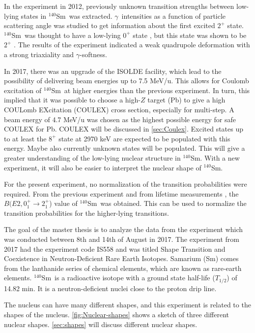 \documentclass[twoside,english]{uiofysmaster/uiofysmaster}
\newcommand{\Sm}{$^{140}$Sm} %
\newcommand{\ga}{$\gamma$}
\let\orgautoref\autoref
\renewcommand{\autoref}
        {%
		 \def\sectionautorefname{Section}%
		 \def\subsectionautorefname{Section}%
		 \def\subsubsectionautorefname{Section}%
		 \def\chapterautorefname{Chapter}%
          \orgautoref}
\begin{document}
In the experiment in 2012, previously unknown transition strengths between low-lying states in \Sm\ was extracted. 
\ga\ intensities as a function of particle scattering angle was studied to get information about the first excited $2^+$ state.
\Sm\ was thought to have a low-lying $0^+$ state \cite{Firestone}, but this state was shown to be $2^+$ \cite{Samorajczyk2015}. 
The results of the experiment indicated a weak quadrupole deformation with a strong triaxiality and \ga-softness.

In 2017, there was an upgrade of the ISOLDE facility, which lead to the possibility of delivering beam energies up to 7.5 MeV/u. 
This allows for Coulomb excitation of \Sm\ at higher energies than the previous experiment.
In turn, this implied that it was possible to choose a high-$Z$ target (Pb) to give a high COULomb EXcitation (COULEX) cross section, especially for multi-step.
A beam energy of 4.7 MeV/u was chosen as the highest possible energy for safe COULEX for Pb.
COULEX will be discussed in \autoref{sec:Coulex}.
Excited states up to at least the $8^+$ state at 2970 keV are expected to be populated with this energy.
Maybe also currently unknown states will be populated.
This will give a greater understanding of the low-lying nuclear structure in \Sm.
With a new experiment, it will also be easier to interpret the nuclear shape of \Sm.

For the present experiment, no normalization of the transition probabilities were required.
From the previous experiment \cite{Klintefjord2016} and from lifetime measurements \cite{BelloGarrote2015}, the $B(E2, 0_1^+ \rightarrow 2_1^+$) value of \Sm\ was obtained. 
This can be used to normalize the transition probabilities for the higher-lying transitions.

The goal of the master thesis is to analyze the data from the experiment which was conducted between 8th and 14th of August in 2017.  
The experiment from 2017 had the experiment code IS558 and was titled Shape Transition and Coexistence in Neutron-Deficient Rare Earth Isotopes.
Samarium (Sm) comes from the lanthanide series of chemical elements, which are known as rare-earth elements.
\Sm\ is a radioactive isotope with a ground state half-life ($T_{1/2}$) of 14.82 min. 
It is a neutron-deficient nuclei close to the proton drip line.

The nucleus can have many different shapes, and this experiment is related to the shapes of the nucleus. 
\autoref{fig:Nuclear-shapes} shows a sketch of three different nuclear shapes. 
\autoref{sec:shapes} will discuss different nuclear shapes.
\end{document}
